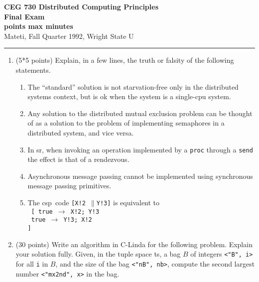 \def\fat{\framebox[1mm]{\rule{0mm}{2mm}}}
\def\pr{$\parallel$}
\def\rar{$\rightarrow$}
\def\CSP{{\sc csp}}
\def\RPC{{\sc rpc}}
\def\SR{{\sc sr}}

\parindent=0pt



{\bf CEG 
\large \bf 730 Distributed Computing Principles\\[5pt]
\large Final Exam\\[10pt]
 points max  minutes\\
}
\bigskip
{Mateti,  Fall Quarter 1992, Wright State U}\\[-5pt]
\hrule

\begin{enumerate}

\item (5*5 points)
Explain, in a few lines, the truth or falsity of the following
statements.

\begin{enumerate}
\item 
The ``standard'' solution  \noindent is not
starvation-free only in the distributed systems context, but is
ok when the system is a single-cpu system.

\item
Any solution to the distributed mutual exclusion problem can be
thought of as a solution to the problem of implementing semaphores in
a distributed system, and vice versa.

\item
In \SR, when invoking an operation implemented by a {\tt proc} through
a {\tt send} the effect is that of a rendezvous.

\item
Asynchronous message passing cannot be implemented using synchronous
message passing primitives.

\item
The \CSP\ code {\tt [X!2 \pr Y!3]} is equivalent to \\
{\tt
[  true \rar\ X!2; Y!3\\
\fat\ true \rar\ Y!3; X!2\\
]}

\end{enumerate}

\item (30 points)
Write an algorithm in C-Linda for the following problem.  Explain your
solution fully.  Given, in the tuple space {\sc ts}, a bag $B$ of
integers {\tt <"B", i>} for all {\tt i} in $B$, and the size of the
bag {\tt <"nB", nb>}, compute the second largest number {\tt <"mx2nd",
x>} in the bag.


\end{enumerate}
